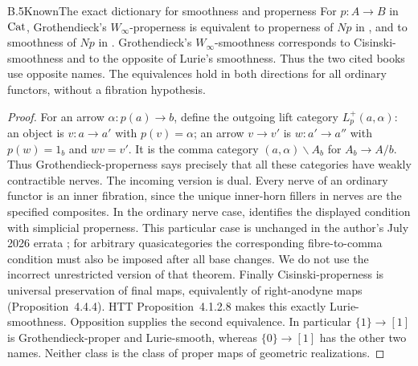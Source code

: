 \begin{claim}{B.5}{Known}{The exact dictionary for smoothness and properness}
For $p:A\to B$ in $\mathrm{Cat}$, Grothendieck's $W_\infty$-properness is equivalent
to properness of $Np$ in \citet[Definition 4.4.1]{BCCisinski2019}, and to
smoothness of $Np$ in \citet[Definition 4.1.2.9]{DGLurieHTT}.
Grothendieck's $W_\infty$-smoothness corresponds to Cisinski-smoothness and
to the opposite of Lurie's smoothness. Thus the two cited books use opposite
names. The equivalences hold in both directions for all ordinary functors,
without a fibration hypothesis.
\end{claim}
\begin{proof}
For an arrow $\alpha:p(a)\to b$, define the outgoing lift category
$L^+_p(a,\alpha)$: an object is $v:a\to a'$ with $p(v)=\alpha$; an arrow
$v\to v'$ is $w:a'\to a''$ with $p(w)=1_b$ and $wv=v'$.
It is the comma category $(a,\alpha)\backslash A_b$ for
$A_b\to A/b$. Thus Grothendieck-properness says precisely that all these
categories have weakly contractible nerves. The incoming version is dual.
Every nerve of an ordinary functor is an inner fibration, since the unique
inner-horn fillers in nerves are the specified composites. In the ordinary
nerve case, \citet[Theorem 4.4.36, condition (ii')]{BCCisinski2019}
identifies the displayed condition with simplicial properness. This particular
case is unchanged in the author's July 2026 errata
\citep[pp.~1--4]{BCCisinskiErrata2026}; for arbitrary quasicategories the
corresponding fibre-to-comma condition must also be imposed after all base
changes. We do not use the incorrect unrestricted version of that theorem.
Finally Cisinski-properness is universal preservation of final maps,
equivalently of right-anodyne maps (Proposition~4.4.4). HTT
Proposition~4.1.2.8 makes this exactly Lurie-smoothness. Opposition supplies
the second equivalence. In particular $\{1\}\to[1]$ is
Grothendieck-proper and Lurie-smooth, whereas $\{0\}\to[1]$ has the other
two names. Neither class is the class of proper maps of geometric realizations.
\end{proof}

